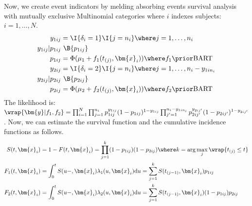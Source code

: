 \documentclass[article]{jss}
\begin{document}
Now, we create event indicators by melding absorbing events survival
analysis with mutually exclusive Multinomial categories where $i$
indexes subjects: $i=1, \dots, N$.
\begin{align*}
y_{1ij} & = \I{\delta_i=1} \I{j=n_i} \where j=1, \dots, n_i\\ %
y_{1ij}|p_{1ij} & ~ \B{p_{1ij}} \\ %
 p_{1ij} & = \Phi(\mu_1+f_1(t_{(j)}, {\bm{x}}_{i})) \where f_1 \prior \mathrm{BART} \\
y_{2ij} & = \I{\delta_i=2} \I{j=n_i}  \where j=1, \dots, n_i-y_{1in_i} \\ %
y_{2ij}|p_{2ij} & ~ \B{p_{2ij}} \\ %
 p_{2ij} & = \Phi(\mu_2+f_2(t_{(j)}, {\bm{x}}_{i})) \where f_2 \prior \mathrm{BART} 
\end{align*}
The likelihood is: $\wrap{\bm{y}|f_1, f_2} = \prod_{i=1}^N 
\prod_{j=1}^{n_i} p_{1ij}^{y_{1ij}} (1-p_{1ij})^{1-y_{1ij}}
\prod_{j'=1}^{n_i-y_{1in_i}} p_{2ij'}^{y_{2ij'}} (1-p_{2ij'})^{1-y_{2ij'}}$.
Now, we can estimate the survival function and the cumulative
incidence functions as follows.
\begin{align*}
S(t, \bm{x}_{i}) & = 1-F(t, \bm{x}_{i}) = \prod_{j=1}^k (1-p_{1ij})(1-p_{2ij}) \where k=\arg \max_j \wrap{t_{(j)} \le t}  \\
F_1(t, \bm{x}_{i}) & = \int_0^t S(u-, \bm{x}_{i}) \lambda_1(u, \bm{x}_{i}) \mathrm{d}u 
= \sum_{j=1}^k S(t_{(j-1)}, \bm{x}_{i}) p_{1ij} \\
F_2(t, \bm{x}_{i}) &  = \int_0^t S(u-, \bm{x}_{i}) \lambda_2(u, \bm{x}_{i}) \mathrm{d}u 
= \sum_{j=1}^k S(t_{(j-1)}, \bm{x}_{i}) (1-p_{1ij}) p_{2ij} 
\end{align*}
\end{document}
